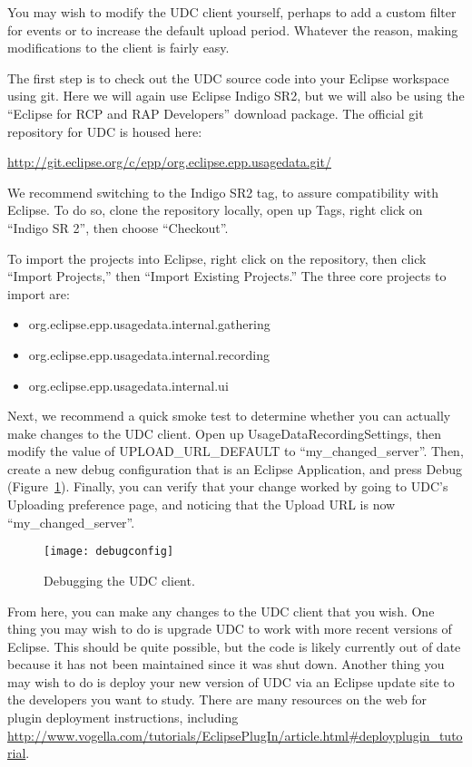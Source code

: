 
You may wish to modify the UDC client yourself, perhaps to add a custom filter for events
or to increase the default upload period.
Whatever the reason, making modifications to the client is fairly easy.

The first step is to check out the UDC source code into your Eclipse
workspace using git.
Here we will again use Eclipse Indigo SR2, but we will also be using the 
``Eclipse for RCP and RAP Developers'' download package.
The official git repository for UDC is housed here:

\noindent
\url{http://git.eclipse.org/c/epp/org.eclipse.epp.usagedata.git/}

We recommend switching to the Indigo SR2 tag, to assure compatibility with
Eclipse.
To do so, clone the repository locally, open up Tags, right click on ``Indigo SR 2'',
then choose ``Checkout''.

To import the projects into Eclipse, right click on the repository, then click 
``Import Projects,'' then ``Import Existing Projects.''
The three core projects to import are:

\begin{itemize}
\item org.eclipse.epp.usagedata.internal.gathering
\item org.eclipse.epp.usagedata.internal.recording
\item org.eclipse.epp.usagedata.internal.ui
\end{itemize}

Next, we recommend a quick smoke test to determine whether you 
can actually make changes to the UDC client.
Open up UsageDataRecordingSettings, then modify the value of UPLOAD\_URL\_DEFAULT
to ``my\_changed\_server''.
Then, create a new debug configuration that is an Eclipse Application, and press 
Debug (Figure~\ref{fig:debugconfig}).
Finally, you can verify that your change worked by going to UDC's Uploading 
preference page, and noticing that the Upload URL is now ``my\_changed\_server''.

\begin{figure}
  \centering
  \texttt{[image: debugconfig]}
  \caption{Debugging the UDC client.}\label{fig:debugconfig}
\end{figure}

From here, you can make any changes to the UDC client that you wish.
One thing you may wish to do is upgrade UDC to work with more recent versions
of Eclipse.
This should be quite possible, but the code is likely currently out of date
because it has not been maintained since it was shut down.
Another thing you may wish to do is deploy your new version of UDC via
an Eclipse update site to the developers you want to study.
There are many resources on the web for plugin deployment instructions,
including \url{http://www.vogella.com/tutorials/EclipsePlugIn/article.html#deployplugin_tutorial}.

